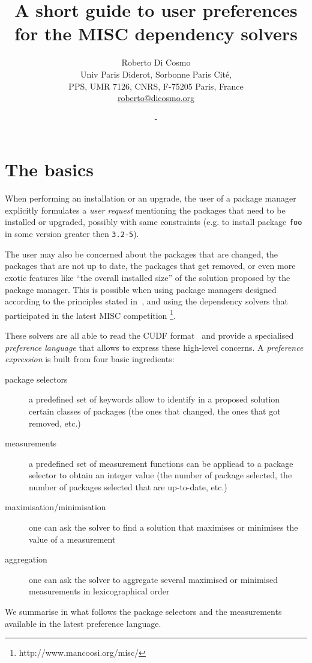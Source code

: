 \documentclass{article}
\title{A short guide to {\bf user preferences}\\ for the MISC dependency solvers}
\author{Roberto Di Cosmo\\Univ Paris Diderot, Sorbonne Paris Cit\'e,\\ PPS, UMR 7126, CNRS,
    F-75205 Paris, France\\\url{roberto@dicosmo.org}}
\date{\DATE{} - \VERSION{}}
\begin{document}
\maketitle

\section{The basics}

When performing an installation or an upgrade, the user of a package manager 
explicitly formulates a \emph{user request} mentioning the packages that need
to be installed or upgraded, possibly with same constraints (e.g. to
install package \texttt{foo} in some version greater then \texttt{3.2-5}).

The user may also be concerned about the packages that are changed, the packages
that are not up to date, the packages that get removed, or even more exotic
features like “the overall installed size” of the solution proposed by the
package manager. This is possible when using package managers designed
according to the principles stated in~\cite{DepSolversNP2012}, and
using the dependency solvers that participated in the latest MISC competition
\footnote{http://www.mancoosi.org/misc/}.

These solvers are all able to read the CUDF format~\cite{mancoosi-tr3} and provide
a specialised \emph{preference language} that allows to express these high-level
concerns.  A \emph{preference expression} is built from four basic ingredients:
\begin{description}
  \item[package selectors] a predefined set of keywords allow to identify in a proposed solution
                           certain classes of packages (the ones that changed, the ones that got removed, etc.)
  \item[measurements] a predefined set of measurement functions can be appliead to a package selector
                      to obtain an integer value (the number of package selected, the number of packages selected that are up-to-date, etc.)
  \item[maximisation/minimisation] one can ask the solver to find a solution that maximises or minimises the value of a measurement 
  \item[aggregation] one can ask the solver to aggregate several maximised or minimised measurements in lexicographical order
\end{description}

We summarise in what follows the package selectors and the measurements available in the latest preference language.
\end{document}
